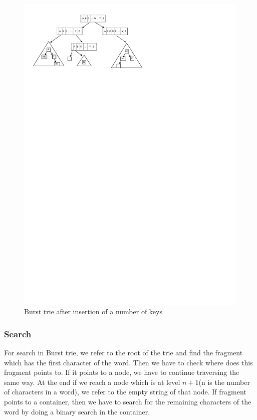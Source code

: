 \documentclass[12pt]{report}
\begin{document}
\begin{figure}[h!]
\includegraphics[trim = 10mm 80mm 20mm 5mm, clip ,  width=\textwidth]{bursttrie}
\caption{ Burst trie after insertion of a number of keys}
\end{figure}

\subsubsection{Search}

For search in Burst trie, we refer to the root of the trie and find the fragment which has the first character of the word. Then we have to check where does this fragment points to. If it points to a node, we have to continue traversing the same way. At the end if we reach a node which is at level $n+1$(n is the number of characters in a word), we refer to the empty string of that node. If fragment points to a container, then we have to search for the remaining characters of the word by doing a binary search in the container.
\end{document}
